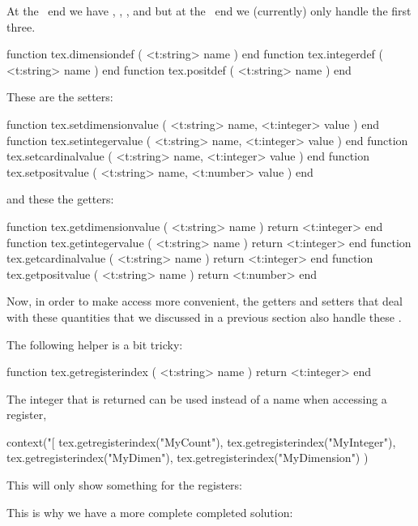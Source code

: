 At the \TEX\ end we have \type {\integerdef}, \type {\dimensiondef}, \type
{\floatdef}, \type {\gluespecdef} and \type {\mugluespecdef} but at the \LUA\ end
we (currently) only handle the first three.

\starttyping[option=LUA]
function tex.dimensiondef ( <t:string> name ) end
function tex.integerdef   ( <t:string> name ) end
function tex.positdef     ( <t:string> name ) end
\stoptyping

These are the setters:

\starttyping[option=LUA]
function tex.setdimensionvalue ( <t:string> name, <t:integer> value ) end
function tex.setintegervalue   ( <t:string> name, <t:integer> value ) end
function tex.setcardinalvalue  ( <t:string> name, <t:integer> value ) end
function tex.setpositvalue     ( <t:string> name, <t:number>  value ) end
\stoptyping

and these the getters:

\starttyping[option=LUA]
function tex.getdimensionvalue ( <t:string> name ) return <t:integer> end
function tex.getintegervalue   ( <t:string> name ) return <t:integer> end
function tex.getcardinalvalue  ( <t:string> name ) return <t:integer> end
function tex.getpositvalue     ( <t:string> name ) return <t:number>  end
\stoptyping

Now, in order to make access more convenient, the getters and setters that deal
with these quantities that we discussed in a previous section also handle these
.

The following helper is a bit tricky:

\starttyping[option=LUA]
function tex.getregisterindex ( <t:string> name )
    return <t:integer>
end
\stoptyping

The integer that is returned can be used instead of a name when accessing a register,

\startbuffer
\newcount \MyCount  \newinteger   \MyInteger
\newdimen \MyDimen  \newdimension \MyDimension

\startluacode
    context("[%
        tex.getregisterindex("MyCount"),
        tex.getregisterindex("MyInteger"),
        tex.getregisterindex("MyDimen"),
        tex.getregisterindex("MyDimension")
    )
\stopluacode
\stopbuffer

\typebuffer[option=LUA]

This will only show something for the registers:

\getbuffer

This is why we have a more complete completed solution:

